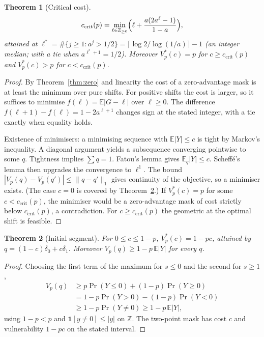\documentclass{article}
\newtheorem{theorem}{Theorem}[section]
\theoremstyle{definition}
\theoremstyle{remark}
\newcommand{\Z}{\mathbb{Z}}
\newcommand{\E}{\mathbb{E}}
\begin{document}
\begin{theorem}[Critical cost]\label{thm:ccrit}
\[
c_{\mathrm{crit}}(p)=\min_{\ell\in\Z_{\ge0}}\Bigl(\ell+\frac{a(2a^\ell-1)}{1-a}\Bigr),
\]
attained at \(\ell^*=\#\{j\ge1:a^j>1/2\}=\lceil\log2/\log(1/a)\rceil-1\) (an integer median; with a tie when \(a^{\ell^*+1}=1/2\)). Moreover \(V_p^*(c)=p\) for \(c\ge c_{\mathrm{crit}}(p)\) and \(V_p^*(c)>p\) for \(c<c_{\mathrm{crit}}(p)\).
\end{theorem}
\begin{proof}
By Theorem~\ref{thm:zero} and linearity the cost of a zero-advantage mask is at least the minimum over pure shifts. For positive shifts the cost is larger, so it suffices to minimise \(f(\ell)=\E|G-\ell|\) over \(\ell\ge0\). The difference \(f(\ell+1)-f(\ell)=1-2a^{\ell+1}\) changes sign at the stated integer, with a tie exactly when equality holds.

Existence of minimisers: a minimising sequence with \(\E|Y|\le c\) is tight by Markov's inequality. A diagonal argument yields a subsequence converging pointwise to some \(q\). Tightness implies \(\sum q=1\). Fatou's lemma gives \(\E_q|Y|\le c\). Scheff\'e's lemma then upgrades the convergence to \(\ell^1\). The bound \(|V_p(q)-V_p(q')|\le\|q-q'\|_1\) gives continuity of the objective, so a minimiser exists. (The case \(c=0\) is covered by Theorem~\ref{thm:initial}.) If \(V_p^*(c)=p\) for some \(c<c_{\mathrm{crit}}(p)\), the minimiser would be a zero-advantage mask of cost strictly below \(c_{\mathrm{crit}}(p)\), a contradiction. For \(c\ge c_{\mathrm{crit}}(p)\) the geometric at the optimal shift is feasible.
\end{proof}

\begin{theorem}[Initial segment]\label{thm:initial}
For \(0\le c\le1-p\), \(V_p^*(c)=1-pc\), attained by \(q=(1-c)\delta_0+c\delta_1\). Moreover \(V_p(q)\ge1-p\,\E|Y|\) for every \(q\).
\end{theorem}
\begin{proof}
Choosing the first term of the maximum for \(s\le0\) and the second for \(s\ge1\),
\begin{align*}
V_p(q)&\ge p\Pr(Y\le0)+(1-p)\Pr(Y\ge0)\\
&=1-p\Pr(Y>0)-(1-p)\Pr(Y<0)\\
&\ge1-p\Pr(Y\ne0)\ge1-p\,\E|Y|,
\end{align*}
using \(1-p<p\) and \(\mathbf 1[y\ne0]\le|y|\) on \(\Z\). The two-point mask has cost \(c\) and vulnerability \(1-pc\) on the stated interval.
\end{proof}
\end{document}
